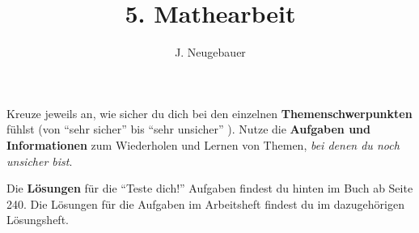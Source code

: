 \documentclass[11pt, a4paper]{scrartcl}
\author{J. Neugebauer}
\title{5. Mathearbeit}
\date{\Heute}
\begin{document}
\CheckupBild\CheckupTitel

Kreuze jeweils an, wie sicher du dich bei den einzelnen \textbf{Themenschwerpunkten} fühlst (von \enquote{sehr sicher}  bis \enquote{sehr unsicher} ). Nutze die \textbf{Aufgaben und Informationen} zum Wiederholen und Lernen von Themen, \emph{bei denen du noch unsicher bist}.

Die \textbf{Lösungen} für die \enquote{Teste dich!} Aufgaben findest du hinten im Buch ab Seite 240. Die Lösungen für die Aufgaben im Arbeitsheft findest du im dazugehörigen Lösungsheft.

\begin{checkup}
\end{checkup}
\end{document}

